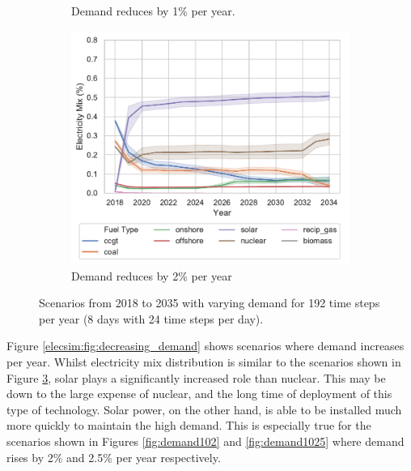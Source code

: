 \begin{figure}
\begin{subfigure}{0.6\textwidth}
		\caption{Demand reduces by 1\% per year.}
		\label{fig:demand099}
	\end{subfigure}
	\begin{subfigure}{0.6\textwidth}
		\centering
		\includegraphics[width=\textwidth]{Chapter4/figures/scenarios/representative-day-scenarios/098_demand_mix.pdf}
		\caption{\small Demand reduces by 2\% per year}
		\label{fig:demand098}
	\end{subfigure}
	\caption{Scenarios from 2018 to 2035 with varying demand for 192 time steps per year (8 days with 24 time steps per day).}
	\label{elecsim:fig:increasing_demand}
\end{figure}


Figure \ref{elecsim:fig:decreasing_demand} shows scenarios where demand increases per year. Whilst electricity mix distribution is similar to the scenarios shown in Figure \ref{elecsim:fig:increasing_demand}, solar plays a significantly increased role than nuclear. This may be down to the large expense of nuclear, and the long time of deployment of this type of technology. Solar power, on the other hand, is able to be installed much more quickly to maintain the high demand. This is especially true for the scenarios shown in Figures \ref{fig:demand102} and \ref{fig:demand1025} where demand rises by 2\% and 2.5\% per year respectively. 



